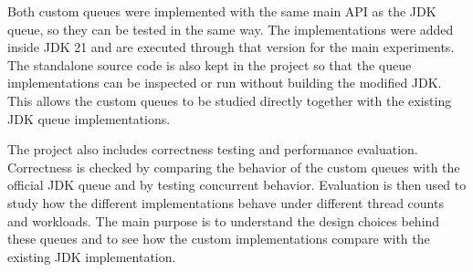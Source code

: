 Both custom queues were implemented with the same main API as the JDK queue, so they can be tested in the same way. The implementations were added inside JDK 21 and are executed through that version for the main experiments. The standalone source code is also kept in the project so that the queue implementations can be inspected or run without building the modified JDK. This allows the custom queues to be studied directly together with the existing JDK queue implementations.

The project also includes correctness testing and performance evaluation. Correctness is checked by comparing the behavior of the custom queues with the official JDK queue and by testing concurrent behavior. Evaluation is then used to study how the different implementations behave under different thread counts and workloads. The main purpose is to understand the design choices behind these queues and to see how the custom implementations compare with the existing JDK implementation.
